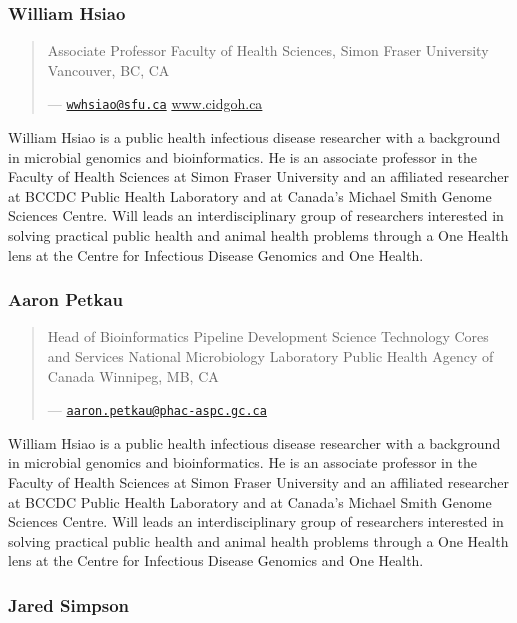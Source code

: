 \documentclass[
]{book}
\begin{document}
\subsubsection{William Hsiao}\label{william-hsiao}

\begin{quote}
Associate Professor
Faculty of Health Sciences, Simon Fraser University
Vancouver, BC, CA

--- \href{mailto:wwhsiao@sfu.ca}{\nolinkurl{wwhsiao@sfu.ca}}
\url{www.cidgoh.ca}
\end{quote}

William Hsiao is a public health infectious disease researcher with a background in microbial
genomics and bioinformatics. He is an associate professor in the Faculty of Health Sciences at
Simon Fraser University and an affiliated researcher at BCCDC Public Health Laboratory and at
Canada's Michael Smith Genome Sciences Centre. Will leads an interdisciplinary group of
researchers interested in solving practical public health and animal health problems through a
One Health lens at the Centre for Infectious Disease Genomics and One Health.

\subsubsection{Aaron Petkau}\label{aaron-petkau}

\begin{quote}
Head of Bioinformatics Pipeline Development
Science Technology Cores and Services
National Microbiology Laboratory
Public Health Agency of Canada
Winnipeg, MB, CA

--- \href{mailto:aaron.petkau@phac-aspc.gc.ca}{\nolinkurl{aaron.petkau@phac-aspc.gc.ca}}
\end{quote}

William Hsiao is a public health infectious disease researcher with a background in microbial
genomics and bioinformatics. He is an associate professor in the Faculty of Health Sciences at
Simon Fraser University and an affiliated researcher at BCCDC Public Health Laboratory and at
Canada's Michael Smith Genome Sciences Centre. Will leads an interdisciplinary group of
researchers interested in solving practical public health and animal health problems through a
One Health lens at the Centre for Infectious Disease Genomics and One Health.

\subsubsection{Jared Simpson}\label{jared-simpson}
\end{document}
